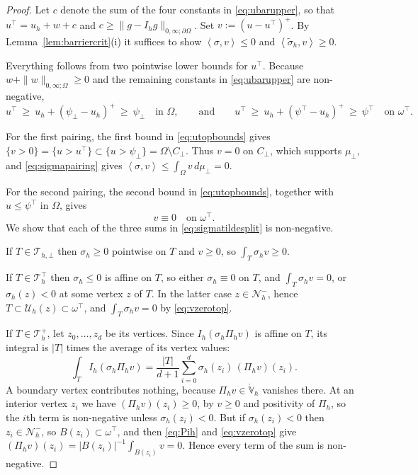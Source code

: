 \documentclass[12pt]{amsart}
\theoremstyle{definition}
\newcommand{\Om}{\Omega}
\newcommand{\dOm}{\partial\Omega}
\newcommand{\psilo}{\psi_\bot}
\newcommand{\psiup}{\psi^\top}
\newcommand{\Cbot}{C_\bot}
\newcommand{\Th}{\mathcal{T}_h}
\newcommand{\Vhr}{\mathring{\mathbb{V}}_h}
\newcommand{\Nh}{\mathcal{N}_h}
\newcommand{\Ih}{I_h}
\newcommand{\Pih}{\Pi_h}
\newcommand{\Uh}{\mathcal{U}_h}
\newcommand{\Thbot}{\mathcal{T}_{h,\bot}}
\newcommand{\Thtop}{\Th^\top}
\newcommand{\Thplus}{\Th^+}
\newcommand{\omtop}{\omega^\top}
\begin{document}
\begin{proof}
Let $c$ denote the sum of the four constants in \eqref{eq:ubarupper}, so that $u^\top = u_h + w + c$ and $c \ge \|g - \Ih g\|_{0,\infty;\dOm}$.  Set $v := (u - u^\top)^+$.  By Lemma~\ref{lem:barriercrit}(i) it suffices to show $\left<\sigma,v\right> \le 0$ and $\left<\tilde\sigma_h,v\right> \ge 0$.

Everything follows from two pointwise lower bounds for $u^\top$.  Because $w + \|w\|_{0,\infty;\Om} \ge 0$ and the remaining constants in \eqref{eq:ubarupper} are non-negative,
\begin{equation}
\label{eq:utopbounds}
  u^\top \ \ge\ u_h + (\psilo - u_h)^+ \ \ge\ \psilo \quad\text{in } \Om,
  \qquad\text{and}\qquad
  u^\top \ \ge\ u_h + (\psiup - u_h)^+ \ \ge\ \psiup \quad\text{on } \omtop.
\end{equation}

For the first pairing, the first bound in \eqref{eq:utopbounds} gives $\{v>0\} = \{u > u^\top\} \subset \{u > \psilo\} = \Om \setminus \Cbot$.  Thus $v = 0$ on $\Cbot$, which supports $\mu_\bot$, and \eqref{eq:sigmapairing} gives $\left<\sigma,v\right> \le \int_\Om v \,d\mu_\bot = 0$.

For the second pairing, the second bound in \eqref{eq:utopbounds}, together with $u \le \psiup$ in $\Om$, gives
\begin{equation}
\label{eq:vzerotop}
  v \equiv 0 \quad \text{on } \omtop.
\end{equation}
We show that each of the three sums in \eqref{eq:sigmatildesplit} is non-negative.

If $T \in \Thbot$ then $\sigma_h \ge 0$ pointwise on $T$ and $v \ge 0$, so $\int_T \sigma_h v \ge 0$.

If $T \in \Thtop$ then $\sigma_h \le 0$ is affine on $T$, so either $\sigma_h \equiv 0$ on $T$, and $\int_T \sigma_h v = 0$, or $\sigma_h(z) < 0$ at some vertex $z$ of $T$.  In the latter case $z \in \Nh^-$, hence $T \subset \Uh(z) \subset \omtop$, and $\int_T \sigma_h v = 0$ by \eqref{eq:vzerotop}.

If $T \in \Thplus$, let $z_0,\dots,z_d$ be its vertices.  Since $\Ih(\sigma_h \Pih v)$ is affine on $T$, its integral is $|T|$ times the average of its vertex values:
\[
  \int_T \Ih(\sigma_h \Pih v) = \frac{|T|}{d+1}\sum_{i=0}^d \sigma_h(z_i)\,(\Pih v)(z_i).
\]
A boundary vertex contributes nothing, because $\Pih v \in \Vhr$ vanishes there.  At an interior vertex $z_i$ we have $(\Pih v)(z_i) \ge 0$, by $v \ge 0$ and positivity of $\Pih$, so the $i$th term is non-negative unless $\sigma_h(z_i) < 0$.  But if $\sigma_h(z_i) < 0$ then $z_i \in \Nh^-$, so $B(z_i) \subset \omtop$, and then \eqref{eq:Pih} and \eqref{eq:vzerotop} give $(\Pih v)(z_i) = |B(z_i)|^{-1}\int_{B(z_i)} v = 0$.  Hence every term of the sum is non-negative.
\end{proof}
\end{document}
